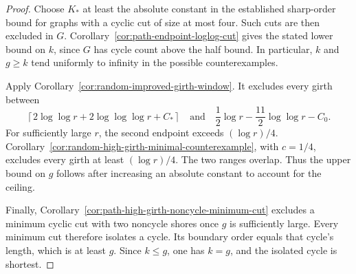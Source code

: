\begin{proof}
Choose $K_*$ at least the absolute constant in the established sharp-order bound for graphs with a cyclic cut of size at most four.
Such cuts are then excluded in $G$.
Corollary~\ref{cor:path-endpoint-loglog-cut} gives the stated lower bound on $k$, since $G$ has cycle count above the half bound.
In particular, $k$ and $g\ge k$ tend uniformly to infinity in the possible counterexamples.

Apply Corollary~\ref{cor:random-improved-girth-window}.
It excludes every girth between
\[
 \left\lceil2\log\log r+2\log\log\log r+C_*\right\rceil
 \quad\text{and}\quad
 \frac12\log r-\frac{11}{2}\log\log r-C_0.
\]
For sufficiently large $r$, the second endpoint exceeds $(\log r)/4$.
Corollary~\ref{cor:random-high-girth-minimal-counterexample}, with $c=1/4$, excludes every girth at least $(\log r)/4$.
The two ranges overlap.
Thus the upper bound on $g$ follows after increasing an absolute constant to account for the ceiling.

Finally, Corollary~\ref{cor:path-high-girth-noncycle-minimum-cut} excludes a minimum cyclic cut with two noncycle shores once $g$ is sufficiently large.
Every minimum cut therefore isolates a cycle.
Its boundary order equals that cycle's length, which is at least $g$.
Since $k\le g$, one has $k=g$, and the isolated cycle is shortest.
\end{proof}
